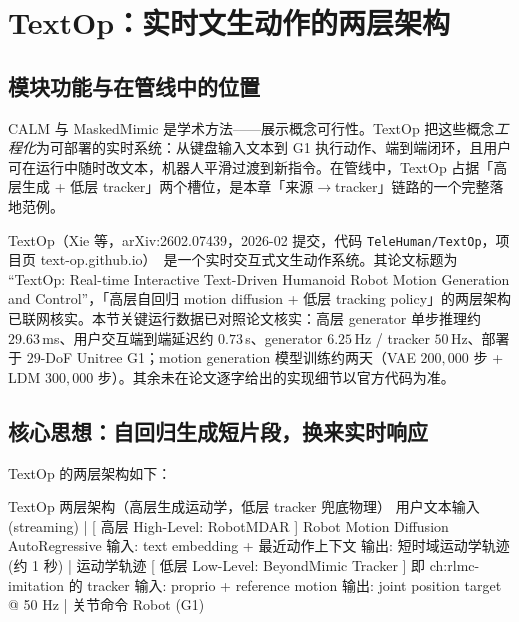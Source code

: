 \section{TextOp：实时文生动作的两层架构}
\label{sec:rlmc-mm-textop}

\subsection{模块功能与在管线中的位置}
\label{sec:rlmc-mm-textop-pos}

CALM 与 MaskedMimic 是学术方法——展示概念可行性。TextOp 把这些概念\emph{工程化}为可部署的实时系统：从键盘输入文本到 G1 执行动作、端到端闭环，且用户可在运行中随时改文本，机器人平滑过渡到新指令。在管线中，TextOp 占据「高层生成 + 低层 tracker」两个槽位，是本章「来源$\to$tracker」链路的一个完整落地范例。

\begin{note}
TextOp（Xie 等，arXiv:2602.07439，2026-02 提交，代码 \texttt{TeleHuman/TextOp}，项目页 text-op.github.io）\,\cite{xie2026textop} 是一个实时交互式文生动作系统。其论文标题为 ``TextOp: Real-time Interactive Text-Driven Humanoid Robot Motion Generation and Control''，「高层自回归 motion diffusion + 低层 tracking policy」的两层架构已联网核实。本节关键运行数据已对照论文核实：高层 generator 单步推理约 $29.63$\,ms、用户交互端到端延迟约 $0.73$\,s、generator $6.25$\,Hz / tracker $50$\,Hz、部署于 $29$-DoF Unitree G1；motion generation 模型训练约两天（VAE $200{,}000$ 步 + LDM $300{,}000$ 步）。其余未在论文逐字给出的实现细节以官方代码为准。
\end{note}

\subsection{核心思想：自回归生成短片段，换来实时响应}
\label{sec:rlmc-mm-textop-arch}

TextOp 的两层架构如下：

\begin{codebox}{TextOp 两层架构（高层生成运动学，低层 tracker 兜底物理）}
用户文本输入 (streaming)
   |
[ 高层 High-Level: RobotMDAR ]  Robot Motion Diffusion AutoRegressive
   输入: text embedding + 最近动作上下文
   输出: 短时域运动学轨迹 (约 1 秒)
   |  运动学轨迹
[ 低层 Low-Level: BeyondMimic Tracker ]  即 ch:rlmc-imitation 的 tracker
   输入: proprio + reference motion
   输出: joint position target @ 50 Hz
   |  关节命令
Robot (G1)
\end{codebox}

